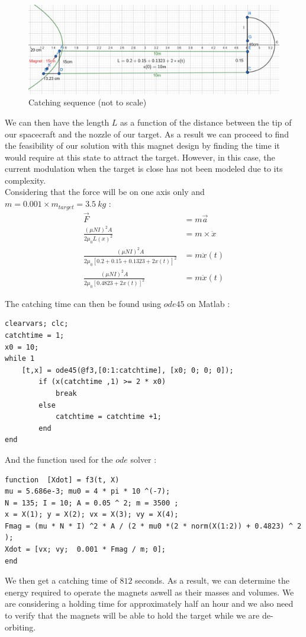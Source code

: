 \begin{figure}[H]
	\centering
	\includegraphics[width=\linewidth]{catching}
	\caption{Catching sequence (not to scale)}
\end{figure}
We can then have the length $L$ as a function of the distance between the tip of our spacecraft and the nozzle of our target. As a result we can proceed to find the feasibility of our solution with this magnet design by finding the time it would require at this state to attract the target. However, in this case, the current modulation when the target is close has not been modeled due to its complexity.\\

Considering that the force will be on one axis only and $m = 0.001\times m_{target} = 3.5\ kg$ :
\begin{align}
\vec F &= m\vec a\\
\frac{(\mu NI)^2 A}{2\mu_0 L(x)^2} &= m \times \ddot x\\
\frac{(\mu NI)^2 A}{2\mu_0 [0.2 + 0.15 + 0.1323 + 2x(t)]^2} &= m \ddot x(t)\\
\frac{(\mu NI)^2 A}{2\mu_0 [0.4823 + 2x(t)]^2} &= m \ddot x(t)
\end{align}

The catching time can then be found using $ode45$ on Matlab :
\begin{verbatim}
clearvars; clc;
catchtime = 1;
x0 = 10;
while 1
    [t,x] = ode45(@f3,[0:1:catchtime], [x0; 0; 0; 0]);
        if (x(catchtime ,1) >= 2 * x0)
            break
        else
            catchtime = catchtime +1;
        end
end
\end{verbatim}
And the function used for the $ode$ solver :
\begin{verbatim}
function  [Xdot] = f3(t, X)
mu = 5.686e-3; mu0 = 4 * pi * 10 ^(-7);
N = 135; I = 10; A = 0.05 ^ 2; m = 3500 ;
x = X(1); y = X(2); vx = X(3); vy = X(4);
Fmag = (mu * N * I) ^2 * A / (2 * mu0 *(2 * norm(X(1:2)) + 0.4823) ^ 2 );
Xdot = [vx; vy;  0.001 * Fmag / m; 0]; 
end
\end{verbatim}
We then get a catching time of $812$ seconds. As a result, we can determine the energy required to operate the magnets aswell as their masses and volumes. We are considering a holding time for approximately half an hour and we also need to verify that the magnets will be able to hold the target while we are de-orbiting.